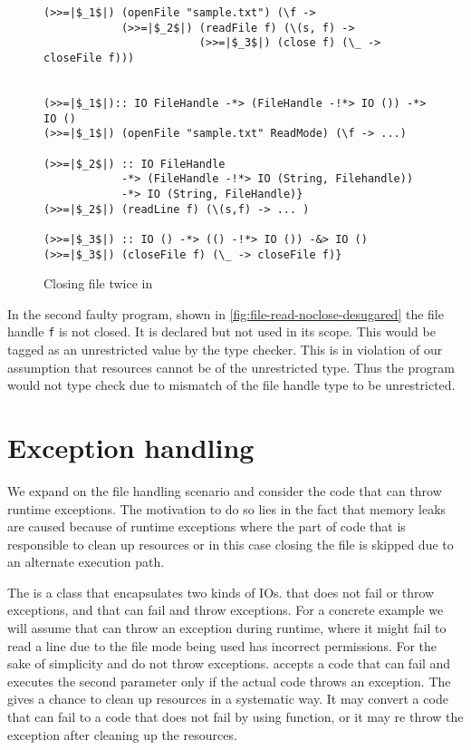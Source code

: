 \begin{figure}[h]
\begin{framed}
\begin{verbatim}
(>>=|$_1$|) (openFile "sample.txt") (\f ->
            (>>=|$_2$|) (readFile f) (\(s, f) ->
                        (>>=|$_3$|) (close f) (\_ -> closeFile f)))


(>>=|$_1$|):: IO FileHandle -*> (FileHandle -!*> IO ()) -*> IO ()
(>>=|$_1$|) (openFile "sample.txt" ReadMode) (\f -> ...)

(>>=|$_2$|) :: IO FileHandle
            -*> (FileHandle -!*> IO (String, Filehandle))
            -*> IO (String, FileHandle)}
(>>=|$_2$|) (readLine f) (\(s,f) -> ... )

(>>=|$_3$|) :: IO () -*> (() -!*> IO ()) -&> IO ()
(>>=|$_3$|) (closeFile f) (\_ -> closeFile f)}
\end{verbatim}
\end{framed}
\caption{Closing file twice in \qub{}}
\label{fig:qub-close-file-twice}
\end{figure}

In the second faulty program, shown in \cref{fig:file-read-noclose-desugared} the file handle \texttt{f} is not closed.
It is declared but not used in its scope. This would be tagged as an unrestricted value by the \qub{} type checker.
This is in violation of our assumption that resources cannot be of the unrestricted type. Thus
the program would not type check due to mismatch of the file handle type to be unrestricted.

\section{Exception handling}
We expand on the file handling scenario and consider the code that can throw runtime exceptions.
The motivation to do so lies in the fact that memory leaks are caused because of runtime
exceptions where the part of code that is responsible to clean up resources or in this case
closing the file is skipped due to an alternate execution path.

The  is a class that encapsulates two kinds of IOs.  that does not fail
or throw exceptions, and  that can fail and throw exceptions.
For a concrete example we will assume that  can throw an exception during runtime, where
it might fail to read a line due to the file mode being used has incorrect permissions.
For the sake of simplicity  and  do not throw exceptions.
 accepts a code that can fail and executes the second
parameter only if the actual code throws an exception. The  gives a chance
to clean up resources in a systematic way. It may convert a code that can fail to a code
that does not fail by using  function, or it may re throw the exception after
cleaning up the resources.

